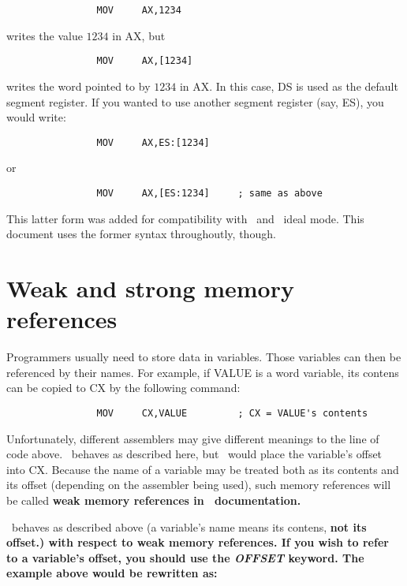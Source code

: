 \documentclass[a4paper,draft,12pt]{book}
\begin{document}
\begin{verbatim}
                MOV     AX,1234
\end{verbatim}

\noindent writes the value $1234$ in AX, but

\begin{verbatim}
                MOV     AX,[1234]
\end{verbatim}

\noindent writes the word pointed to by $1234$ in AX. In this case, DS is used as the
default segment register. If you wanted to use another segment register (say,
ES), you would write:

\begin{verbatim}
                MOV     AX,ES:[1234]
\end{verbatim}

\noindent or

\begin{verbatim}
                MOV     AX,[ES:1234]     ; same as above
\end{verbatim}

This latter form was added for compatibility with \nasm\ and \tasm\ ideal mode.
This document uses the former syntax throughoutly, though.

\section{Weak and strong memory references}
Programmers usually need to store data in variables. Those variables can then
be referenced by their names. For example, if VALUE is a word variable, its
contens can be copied to CX by the following command:

\begin{verbatim}
                MOV     CX,VALUE         ; CX = VALUE's contents
\end{verbatim}

Unfortunately, different assemblers may give different meanings to the line
of code above. \tasm\ behaves as described here, but \nasm\ would place the
variable's offset into CX. Because the name of a variable may be treated both
as its contents and its offset (depending on the assembler being used), such
memory references will be called \bf{weak memory references} in \popasm\ 
documentation.

\popasm\ behaves as described above (a variable's name means its contens, \bf{not}
its offset.) with respect to weak memory references. If you wish to refer to
a variable's offset, you should use the \emph{OFFSET} keyword. The example
above would be rewritten as:
\end{document}
